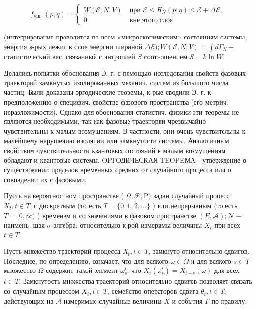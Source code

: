 \documentclass[10pt]{article}
\begin{document}
\[

f_{\text {м.к. }}(p, q)= \begin{cases}W(\mathscr{E}, N, V) & \text { при } \mathscr{E} \leqslant H_{N}(p, q) \leqslant \mathscr{E}+\Delta \mathscr{E}, \\ 0 & \text { вне этого слоя }\end{cases}

\]



(интегрирование проводится по всем «микроскопическим» состояниям системы, энергия к-рых лежит в слое энергии шириной $\Delta \mathscr{E}) ; W(\mathscr{E}, N, V)=\int d \Gamma_{N}-$ статистический вес, связанный с энтропией $S$ соотношением $S=k \ln W$.



Делались попытки обоснования Э. г. с помощью исследования свойств фазовых траекторий замкнутых изолированных механич. систем из большого числа частиц. Были доказаны эргодические теоремы, к-рые сводили Э. г. к предположению о специфич. свойстве фазового пространства (его метрич. неразложимости). Однако для обоснования статистич. физики эти теоремы не являются необходимыми, так как фазовые траектории чрезвычайно чувствительны к малым возмущениям. В частности, они очень чувствительны к малейшему нарушению изоляции или замкнутости системы. Аналогичным свойством чувствительности квантовых состояний к малым возмущениям обладают и квантовые системы. OPГОДИЧЕСКАЯ TEOPEМА - утверждение о существовании пределов временных средних от случайного процесса или о совпадении их с фазовыми.



Пусть на вероятностном пространстве ( $\Omega, \mathscr{F}, \mathrm{P})$ задан случайный процесс $X_{t}, t \in T$, с дискретным (то есть $T=\{0,1$, $2, \ldots\}$ ) или непрерывным (то есть $T=[0, \infty)$ ) временем и со значениями в фазовом пространстве $(E, \mathscr{A}) ; \mathcal{N}-$ наимень- шая $\sigma$-алгебра, относительно к-рой измеримы величины $X_{t}$ при всех $t \in T$.



Пусть множество траекторий процесса $X_{t}, t \in T$, замкнуто относительно сдвигов. Последнее, по определению, означает, что для всякого $\omega \in \Omega$ и для всякого $s \in T$ множество $\Omega$ содержит такой элемент $\omega_{s}^{t}$, что $X_{t}\left(\omega_{s}^{t}\right)=X_{t+s}(\omega)$ для всех $t \in T$. Замкнутость множества траекторий относительно сдвигов позволяет связать со случайным процессом $X_{t}, t \in T$, семейство операторов сдвига $\theta_{t}, t \in T$, действующих на $\mathcal{A}$-измеримые случайные величины $X$ и события $\Gamma$ по правилу:
\end{document}
